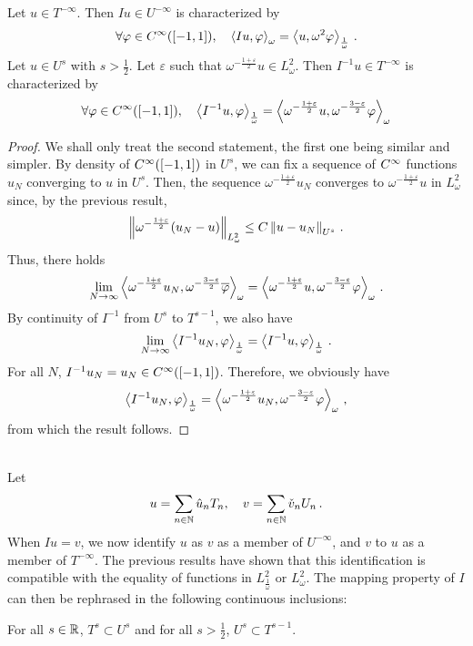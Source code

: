 \documentclass[a4paper]{article}
\begin{document}
\begin{Cor}
	Let $u \in T^{-\infty}$. Then $Iu \in U^{-\infty}$ is characterized by
	\[\forall \varphi\in C^{\infty}([-1,1]),\quad \left\langle Iu,\varphi\right\rangle_\omega = \left\langle u,\omega^2 \varphi\right\rangle_\frac{1}{\omega}\,.\]
	Let $u \in U^s$ with $s > \frac{1}{2}$. Let $\varepsilon$ such that $\omega^{-\frac{1+ \varepsilon}{2} }u \in L^2_\omega$. Then $I^{-1}u \in T^{-\infty}$ is characterized by 
	\[\forall \varphi\in C^{\infty}([-1,1]), \quad \left\langle I^{-1}u,\varphi\right\rangle_\frac{1}{\omega}=\left\langle {\omega^{-\frac{1+ \varepsilon}{2} }u},{\omega^{-\frac{3- \varepsilon}{2} } \varphi}\right\rangle_\omega \]
\end{Cor}
\begin{proof}
	We shall only treat the second statement, the first one being similar and simpler. By density of $C^{\infty}([-1,1])$ in $U^s$, we can fix a sequence of $C^{\infty}$ functions $u_N$ converging to $u$ in $U^s$. Then, the sequence $\omega^{-\frac{1 + \varepsilon}{2}}u_N$ converges to $\omega^{-\frac{1 + \varepsilon}{2}}u$ in $L^2_\omega$ since, by the previous result,
	\[\left\|\omega^{-\frac{1+ \varepsilon}{2}}(u_N - u)\right\|_{L^2_\omega} \leq C \left\|u - u_N\right\|_{U^{s}}\,.\]
	Thus, there holds 
	\[\lim_{N \to \infty} \left\langle {\omega^{-\frac{1+ \varepsilon}{2} }u_N},{\omega^{-\frac{3- \varepsilon}{2} }\overline \varphi}\right\rangle_\omega = \left\langle {\omega^{-\frac{1+ \varepsilon}{2} }u},{\omega^{-\frac{3- \varepsilon}{2} } \varphi}\right\rangle_\omega\,.\]
	By continuity of $I^{-1}$ from $U^s$ to $T^{s - 1}$, we also have 
	\[\lim_{N \to \infty}\left\langle I^{-1} u_N,\varphi\right\rangle_{\frac{1}{\omega}} = \left\langle I^{-1} u,\varphi\right\rangle_{\frac{1}{\omega}}\,. \]
	For all $N$, $I^{-1}u_N = u_N \in C^{\infty}([-1,1])$. Therefore, we obviously have
	\[\left\langle I^{-1}u_N,\varphi\right\rangle_{\frac{1}{\omega}} =  \left\langle {\omega^{-\frac{1+ \varepsilon}{2} }u_N},{\omega^{-\frac{3- \varepsilon}{2} } \varphi}\right\rangle_\omega\,,\] 
	from which the result follows.
\end{proof}
\noindent{}\\
\noindent Let
\[u = \sum_{n \in \mathbb{N} } \hat{u}_n T_n, \quad v = \sum_{n \in \mathbb{N}} \check{v}_n U_n\,.\]
When $Iu = v$, we now identify $u$ as $v$ as a member of $U^{-\infty}$, and $v$ to $u$ as a member of $T^{-\infty}$. The previous results have shown that this identification is compatible with the equality of functions in $L^2_\frac{1}{\omega}$ or $L^2_\omega$. The mapping property of $I$ can then be rephrased in the following continuous inclusions:
\begin{Cor}
	For all $s \in \mathbb{R}$, $T^s \subset U^s$ and for all $s > \frac{1}{2}$, $U^s \subset T^{s-1}$.    
\end{Cor}
\end{document}
